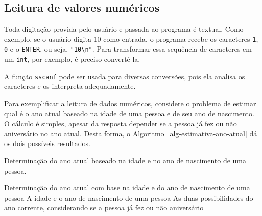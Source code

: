 \documentclass[
  11pt,
  a4paper,
]{scrbook}
\begin{document}
\subsection{Leitura de valores
numéricos}\label{leitura-de-valores-numuxe9ricos}

Toda digitação provida pelo usuário e passada ao programa é textual.
Como exemplo, se o usuário digita 10 como entrada, o programa recebe os
caracteres \texttt{1}, \texttt{0} e o \texttt{ENTER}, ou seja,
\texttt{"10\textbackslash{}n"}. Para transformar essa sequência de
caracteres em um \texttt{int}, por exemplo, é preciso convertê-la.

A função \texttt{sscanf} pode ser usada para diversas conversões, pois
ela analisa os caracteres e os interpreta adequadamente.

Para exemplificar a leitura de dados numéricos, considere o problema de
estimar qual é o ano atual baseado na idade de uma pessoa e de seu ano
de nascimento. O cálculo é simples, apesar da resposta depender se a
pessoa já fez ou não aniversário no ano atual. Desta forma, o
Algoritmo~\ref{alg-estimativa-ano-atual} dá os dois possíveis
resultados.

\begin{algorithm}
\caption{\label{alg-estimativa-ano-atual}Determinação do ano atual
baseado na idade e no ano de nascimento de uma pessoa.}
\begingroup%


\begin{algorithmic}
    \Description Determinação do ano atual com base na idade e do ano de nascimento de uma pessoa
    \Require A idade e o ano de nascimento de uma pessoa
    \Ensure As duas possibilidades do ano corrente, considerando se a pessoa já fez ou não aniversário
    \Statex{}
\end{algorithmic}

\endgroup
\end{algorithm}
\end{document}
